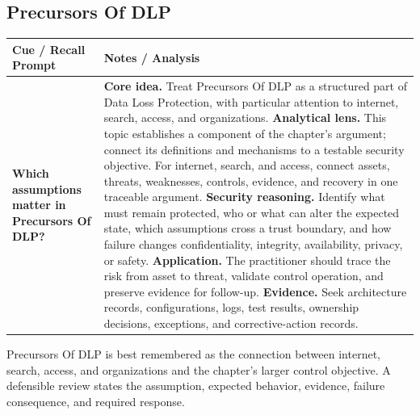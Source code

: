 \documentclass[11pt]{article}
\newcommand{\CornellHeader}{%
\rowcolor{Navy}\color{white}\bfseries Cue / Recall Prompt & \color{white}\bfseries Notes / Analysis\\\hline}
\newcommand{\CornellRow}[2]{%
\cellcolor{CueGray}\RaggedRight\textbf{#1} & \RaggedRight #2\\\hline}
\begin{document}
\subsection*{Precursors Of DLP}
\begin{longtable}{>{\RaggedRight\arraybackslash}p{}|>{\RaggedRight\arraybackslash}p{}}
\CornellHeader
\CornellRow{Which assumptions matter in Precursors Of DLP?}{\textbf{Core idea.} Treat Precursors Of DLP as a structured part of Data Loss Protection, with particular attention to internet, search, access, and organizations. \textbf{Analytical lens.} This topic establishes a component of the chapter's argument; connect its definitions and mechanisms to a testable security objective. For internet, search, and access, connect assets, threats, weaknesses, controls, evidence, and recovery in one traceable argument. \textbf{Security reasoning.} Identify what must remain protected, who or what can alter the expected state, which assumptions cross a trust boundary, and how failure changes confidentiality, integrity, availability, privacy, or safety. \textbf{Application.} The practitioner should trace the risk from asset to threat, validate control operation, and preserve evidence for follow-up. \textbf{Evidence.} Seek architecture records, configurations, logs, test results, ownership decisions, exceptions, and corrective-action records.}
\end{longtable}
\begin{topicsummary}
Precursors Of DLP is best remembered as the connection between internet, search, access, and organizations and the chapter's larger control objective. A defensible review states the assumption, expected behavior, evidence, failure consequence, and required response.
\end{topicsummary}
\end{document}
